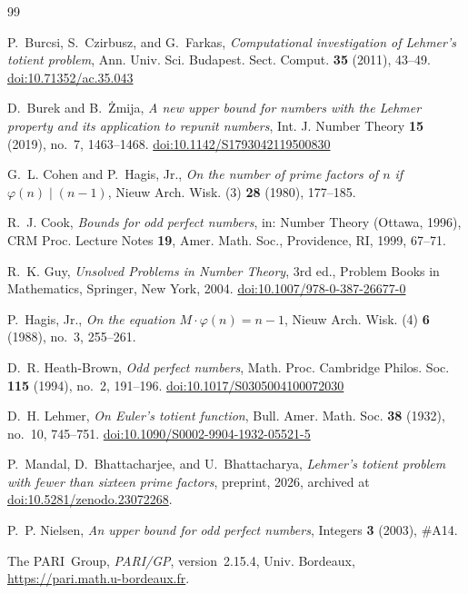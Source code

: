 \documentclass[11pt,reqno]{amsart}
\numberwithin{equation}{section}
\theoremstyle{plain}
\theoremstyle{definition}
\theoremstyle{remark}
\newcommand{\zenododoi}{10.5281/zenodo.23072268}
\begin{document}
\begin{thebibliography}{99}

P.~Burcsi, S.~Czirbusz, and G.~Farkas,
\emph{Computational investigation of Lehmer's totient problem},
Ann. Univ. Sci. Budapest. Sect. Comput. \textbf{35} (2011), 43--49.
\href{https://doi.org/10.71352/ac.35.043}{doi:10.71352/ac.35.043}

D.~Burek and B.~\.Zmija,
\emph{A new upper bound for numbers with the Lehmer property and its
application to repunit numbers},
Int. J. Number Theory \textbf{15} (2019), no.~7, 1463--1468.
\href{https://doi.org/10.1142/S1793042119500830}{doi:10.1142/S1793042119500830}

G.~L. Cohen and P.~Hagis, Jr.,
\emph{On the number of prime factors of $n$ if $\varphi(n)\mid(n-1)$},
Nieuw Arch. Wisk. (3) \textbf{28} (1980), 177--185.

R.~J. Cook,
\emph{Bounds for odd perfect numbers},
in: Number Theory (Ottawa, 1996), CRM Proc. Lecture Notes \textbf{19},
Amer. Math. Soc., Providence, RI, 1999, 67--71.

R.~K. Guy,
\emph{Unsolved Problems in Number Theory}, 3rd ed.,
Problem Books in Mathematics, Springer, New York, 2004.
\href{https://doi.org/10.1007/978-0-387-26677-0}{doi:10.1007/978-0-387-26677-0}

P.~Hagis, Jr.,
\emph{On the equation $M\cdot\varphi(n)=n-1$},
Nieuw Arch. Wisk. (4) \textbf{6} (1988), no.~3, 255--261.

D.~R. Heath-Brown,
\emph{Odd perfect numbers},
Math. Proc. Cambridge Philos. Soc. \textbf{115} (1994), no.~2, 191--196.
\href{https://doi.org/10.1017/S0305004100072030}{doi:10.1017/S0305004100072030}

D.~H. Lehmer,
\emph{On Euler's totient function},
Bull. Amer. Math. Soc. \textbf{38} (1932), no.~10, 745--751.
\href{https://doi.org/10.1090/S0002-9904-1932-05521-5}{doi:10.1090/S0002-9904-1932-05521-5}

P.~Mandal, D.~Bhattacharjee, and U.~Bhattacharya,
\emph{Lehmer's totient problem with fewer than sixteen prime factors},
preprint, 2026, archived at
\href{https://doi.org/\zenododoi}{doi:\zenododoi}.

P.~P. Nielsen,
\emph{An upper bound for odd perfect numbers},
Integers \textbf{3} (2003), \#A14.

The PARI~Group,
\emph{PARI/GP}, version~2.15.4, Univ. Bordeaux,
\url{https://pari.math.u-bordeaux.fr}.


\end{thebibliography}
\end{document}
